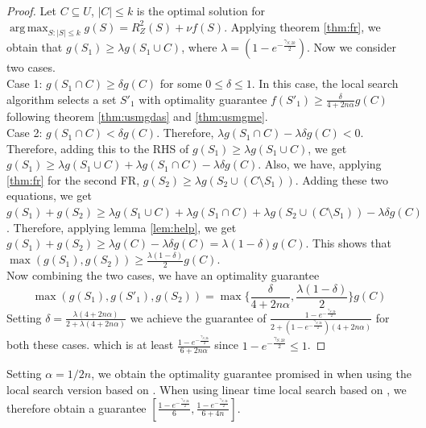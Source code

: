 \begin{proof}
 Let $C\subseteq U$, $|C|\le k$ is the optimal solution for $\operatorname*{arg\,max}_{S:|S|\le k} g(S) = R^2_Z(S) + \nu f(S)$. Applying theorem \ref{thm:fr}, we obtain that $g(S_1)\ge \lambda g(S_1\cup C)$, where $\lambda=(1-e^{-\frac{\gamma_{S,2k}}{2}})$. Now we consider two cases.\\
 Case 1: $g(S_1\cap C)\ge \delta g(C)$ for some $0\le \delta\le 1$. In this case, the local search algorithm selects a set $S'_1$ with optimality guarantee $f(S'_1)\ge\frac{\delta}{4+2n\alpha}g(C)$ following theorem \ref{thm:usmgdas} and \ref{thm:usmgme}.\\
 Case 2: $g(S_1\cap C)< \delta g(C)$. Therefore, $\lambda g(S_1\cap C) -\lambda \delta g(C)<0$. Therefore, adding this to the RHS of $g(S_1)\ge \lambda g(S_1\cup C)$, we get $g(S_1)\ge \lambda g(S_1\cup C) + \lambda g(S_1\cap C) -\lambda \delta g(C)$. Also, we have, applying \ref{thm:fr} for the second FR, $g(S_2)\ge \lambda g(S_2\cup (C\setminus S_1))$. Adding these two equations, we get $g(S_1)+g(S_2)\ge \lambda g(S_1\cup C) + \lambda g(S_1\cap C) + \lambda g(S_2\cup (C\setminus S_1)) -\lambda \delta g(C)$. Therefore, applying lemma \ref{lem:help}, we get $g(S_1)+g(S_2)\ge \lambda g(C)-\lambda \delta g(C)=\lambda(1-\delta)g(C)$. This shows that $\max(g(S_1),g(S_2))\ge \frac{\lambda(1-\delta)}{2}g(C)$.\\
 Now combining the two cases, we have an optimality guarantee
 \[\max(g(S_1),g(S'_1),g(S_2))=\max\{\frac{\delta}{4+2n\alpha},\frac{\lambda(1-\delta)}{2}\}g(C)\]
 Setting $\delta=\frac{\lambda(4+2n\alpha)}{2+\lambda(4+2n\alpha)}$ we achieve the guarantee of $\frac{1-e^{-\frac{\gamma_{S,2k}}{2}}}{2+(1-e^{-\frac{\gamma_{S,2k}}{2}})(4+2n\alpha)}$ for both these cases.
 which is at least $\frac{1-e^{-\frac{\gamma_{S,2k}}{2}}}{6+2n\alpha}$ since $1-e^{-\frac{\gamma_{S,2k}}{2}}\le 1$.
\end{proof}

\noindent Setting $\alpha=1/2n$, we obtain the optimality guarantee promised in \citealp{NIPS2012_4689} when using the local search version based on \citealp{Feige:2011:MNS:2079073.2079078}. When using linear time local search based on \citealp{Buchbinder:2012:TLT:2417500.2417835}, we therefore obtain a guarantee $\left[\frac{1-e^{-\frac{\gamma_{S,2k}}{2}}}{6},\frac{1-e^{-\frac{\gamma_{S,2k}}{2}}}{6+4n}\right]$.